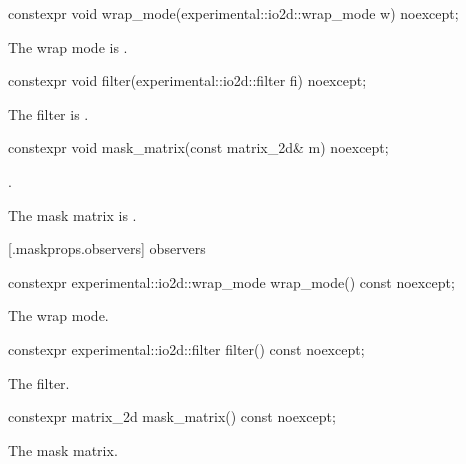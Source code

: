 %
\begin{itemdecl}
constexpr void wrap_mode(experimental::io2d::wrap_mode w) noexcept;
\end{itemdecl}
\begin{itemdescr}
\pnum
\effects
The wrap mode is .
\end{itemdescr}

%
\begin{itemdecl}
constexpr void filter(experimental::io2d::filter fi) noexcept;
\end{itemdecl}
\begin{itemdescr}
\pnum
\effects
The filter is .
\end{itemdescr}

%
\begin{itemdecl}
constexpr void mask_matrix(const matrix_2d& m) noexcept;
\end{itemdecl}
\begin{itemdescr}
\pnum
\requires
{}.

\pnum
\effects
The mask matrix is .
\end{itemdescr}

 [\iotwod.maskprops.observers] { observers}

%
\begin{itemdecl}
constexpr experimental::io2d::wrap_mode wrap_mode() const noexcept;
\end{itemdecl}
\begin{itemdescr}
\pnum
\returns
The wrap mode.
\end{itemdescr}

%
\begin{itemdecl}
constexpr experimental::io2d::filter filter() const noexcept;
\end{itemdecl}
\begin{itemdescr}
\pnum
\returns
The filter.
\end{itemdescr}

%
\begin{itemdecl}
constexpr matrix_2d mask_matrix() const noexcept;
\end{itemdecl}
\begin{itemdescr}
\pnum
\returns
The mask matrix.
\end{itemdescr}
